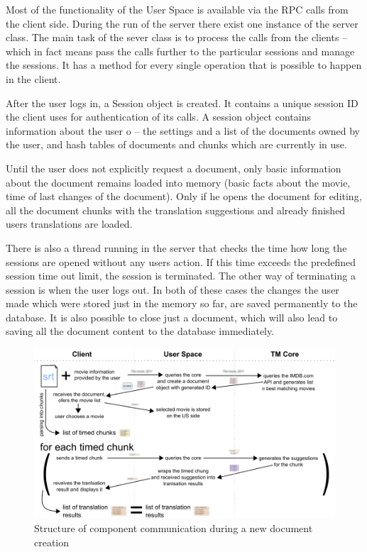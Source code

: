 Most of the functionality of the User Space is available via the RPC calls from the client side. During the run of the server there exist one instance of the server class. The main task of the sever class is to process the calls from the clients -- which in fact means pass the calls further to the particular sessions and manage the sessions. It has a method for every single operation that is possible to happen in the client.

After the user logs in, a Session object is created. It contains a unique session ID the client uses for authentication of its calls. A session object contains information about the user o -- the settings and a list of the documents owned by the user, and hash tables of documents and chunks which are currently in use. 

Until the user does not explicitly request a document, only basic information about the document remains loaded into memory (basic facts about the movie, time of last changes of the document). Only if he opens the document for editing, all the document chunks with the translation suggestions and already finished users translations are loaded.

There is also a thread running in the server that checks the time how long the sessions are opened without any users action. If this time exceeds the predefined session time out limit, the session is terminated. The other way of terminating a session is when the user logs out. In both of these cases the changes the user made which were stored just in the memory so far, are saved permanently to the database. It is also possible to close just a document, which will also lead to saving all the document content to the database immediately.

\begin{figure}
\begin{center}
\includegraphics{figures/creating_document.pdf}
\end{center}
\caption{Structure of component communication during a new document creation}
\end{figure}

